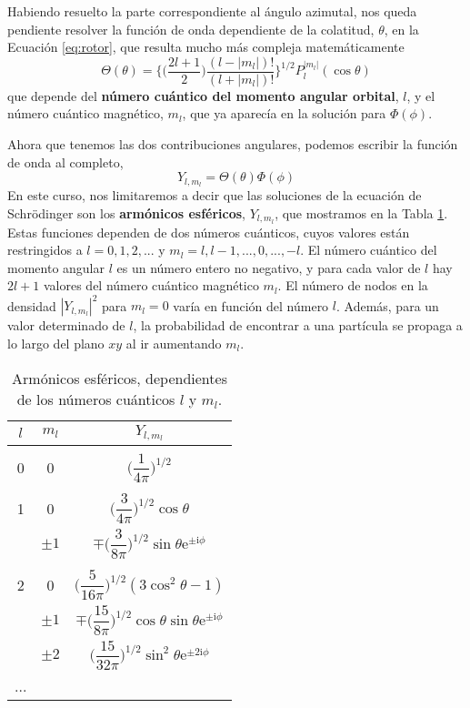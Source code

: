 Habiendo resuelto la parte correspondiente al ángulo 
azimutal, nos queda pendiente resolver la función de onda
dependiente de la colatitud, $\theta$, en la Ecuación
\ref{eq:rotor}, que resulta mucho más compleja 
matemáticamente
\begin{equation}
    \Theta(\theta)=\bigg\{ 
    \bigg(
    \frac{2l+1}{2}
    \bigg)
    \frac{(l-|m_l|)!}{(l+|m_l|)!}
    \bigg\}^{1/2}
    P_l^{|m_l|}(\cos\theta)
\end{equation}
que depende del \textbf{número 
cuántico del momento angular orbital}, $l$, y el número
cuántico magnético, $m_l$, que ya aparecía en la solución
para $\Phi(\phi)$. 

Ahora que tenemos las dos contribuciones angulares, 
podemos escribir la función de onda al completo,
\begin{equation}
    Y_{l,m_l}=\Theta(\theta)\Phi(\phi)
\end{equation}
En este curso, nos limitaremos a decir que las 
soluciones de la ecuación de Schrödinger son los
\textbf{armónicos esféricos}, $Y_{l,m_l}$, 
que mostramos en la Tabla \ref{tb:legendre}. Estas 
funciones dependen de dos números cuánticos, cuyos 
valores están restringidos a $l=0,1,2,...$ y 
$m_l=l, l-1,...,0,...,-l$. El número cuántico del 
momento angular $l$ es un número entero no negativo, y 
para cada valor de $l$ hay $2l+1$ valores del número 
cuántico magnético $m_l$. El número de nodos en la 
densidad $|Y_{l,m_l}|^2$ para $m_l=0$ varía en función 
del número $l$. Además, para un valor determinado de $l$,
la probabilidad de encontrar a una partícula se propaga 
a lo largo del plano $xy$ al ir aumentando $m_l$.

\begin{table}[t!]
    \centering
    \begin{tabular}{c|c|c}
     $l$ & $m_l$ & $ Y_{l,m_l}$ \\
     \hline
     & & \\
    0 & 0       & $\bigg(\dfrac{1}{4\pi}\bigg)^{1/2}$\\ 
     & & \\
    1 & 0       & $\bigg(\dfrac{3}{4\pi}\bigg)^{1/2}\cos{\theta}$ \\ 
      & $\pm 1$ & $\mp\bigg(\dfrac{3}{8\pi}\bigg)^{1/2}\sin{\theta}\mathrm{e}^{\pm \mathrm{i}\phi}$ \\ 
     & & \\
    2 & 0       & $\bigg(\dfrac{5}{16\pi}\bigg)^{1/2}(3\cos^2\theta-1)$ \\ 
      & $\pm 1$  & $\mp\bigg(\dfrac{15}{8\pi}\bigg)^{1/2}\cos\theta\sin\theta\mathrm{e}^{\pm \mathrm{i}\phi}$  \\ 
      & $\pm 2$  & $\bigg(\dfrac{15}{32\pi}\bigg)^{1/2}\sin^2\theta\mathrm{e}^{\pm 2\mathrm{i}\phi}$ \\ 
    ... &  &
    \end{tabular}
    \caption{Armónicos esféricos, dependientes de los números
    cuánticos $l$ y $m_l$.}
    \label{tb:legendre}
\end{table}

